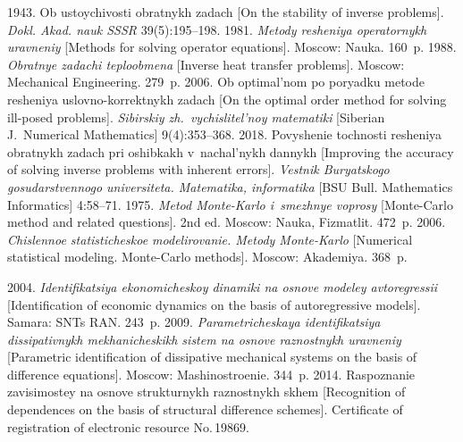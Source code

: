\begin{multicols}{2}
{{\begin{thebibliography}{99}
   1943. Ob ustoychivosti obratnykh zadach [On the stability 
of inverse problems]. \textit{Dokl. Akad. nauk SSSR} 39(5):195--198.
   1981. \textit{Metody resheniya operatornykh uravneniy} 
[Methods for solving operator equations]. Moscow: Nauka. 160~p.
   1988. \textit{Obratnye zadachi teploobmena} [Inverse 
heat transfer problems]. Moscow: Mechanical Engineering. 279~p.
   2006. Ob optimal'nom po poryadku 
metode resheniya uslovno-korrektnykh zadach [On the optimal order method for 
solving ill-posed problems]. \textit{Sibirskiy zh.~vychislitel'noy matematiki} [Siberian 
J.~Numerical Mathematics] 9(4):353--368.
   2018. Povyshenie tochnosti 
resheniya obratnykh zadach pri oshibkakh v~nachal'nykh dannykh [Improving the 
accuracy of solving inverse problems with inherent
errors]. \textit{Vestnik 
Buryatskogo gosudarstvennogo universiteta. Matematika, informatika} 
[BSU Bull. Mathematics Informatics] 4:58--71.  
   1975. \textit{Metod Monte-Karlo i~smezhnye voprosy} 
[Monte-Carlo method and related questions]. 2nd ed. Moscow: Nauka, Fizmatlit. 
472~p. 
   2006. \textit{Chislennoe 
statisticheskoe modelirovanie. Metody Monte-Karlo} [Numerical statistical 
modeling.  Monte-Carlo methods]. Moscow: Akademiya. 368~p.
 
   2004. \textit{Identifikatsiya ekonomicheskoy dinamiki 
na osnove modeley avtoregressii} [Identification of economic dynamics on the basis 
of autoregressive models]. Samara: SNTs RAN. 243~p.
   2009. \textit{Parametricheskaya identifikatsiya dissipativnykh 
mekhanicheskikh sistem na osnove raznostnykh uravneniy} [Parametric 
identification of dissipative mechanical systems on the basis of difference 
equations]. Moscow: Mashinostroenie. 344~p.
   2014. Raspoznanie zavisimostey na osnove 
strukturnykh raznostnykh skhem [Recognition of dependences on the basis of 
structural difference schemes]. Certificate of registration of electronic resource 
No.\,19869. 
\end{thebibliography}

 }
 }

\end{multicols}


